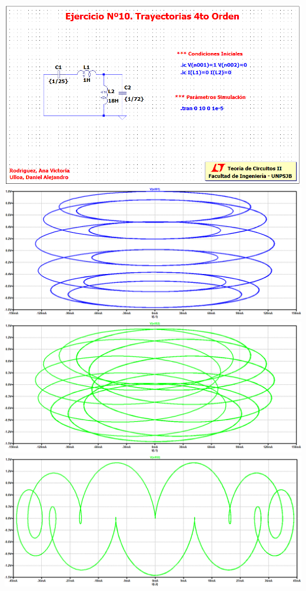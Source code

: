 \documentclass[10pt,a4paper]{article} %
\begin{document}
\begin{center}
		\includegraphics[scale=0.5]{simulacion101}
	    \includegraphics[scale=0.4]{simulacion102}
    	\includegraphics[scale=0.4]{simulacion103}
   		\includegraphics[scale=0.4]{simulacion104}

\end{center}
\end{document}
